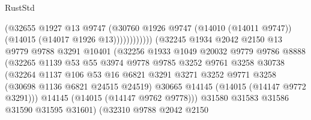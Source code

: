 \begin{lexlean}{RustStd}
\begin{coremodule}
                                          (@32655
                                            @1927
                                            @13
                                            @9747
                                            (@30760
                                              @1926
                                              @9747
                                              (@14010 (@14011 @9747))
                                              (@14015 (@14017 @1926 @13))))))))))))
                          (@32245
                            @1934
                            @2042
                            @2150
                            @13
                            @9779
                            @9788
                            @3291
                            @10401
                            (@32256
                              @1933
                              @1049
                              @20032
                              @9779
                              @9786
                              @8888
                              (@32265
                                @1139
                                @53
                                @55
                                @3974
                                @9778
                                @9785
                                @3252
                                @9761
                                @3258
                                @30738
                                (@32264
                                  @1137
                                  @106
                                  @53
                                  @16
                                  @6821
                                  @3291
                                  @3271
                                  @3252
                                  @9771
                                  @3258
                                  (@30698 @1136 @6821 @24515 @24519)
                                  @30665
                                  @14145
                                  (@14015 (@14147 @9772 @3291)))
                                @14145
                                (@14015 (@14147 @9762 @9778)))
                              @31580
                              @31583
                              @31586
                              @31590
                              @31595
                              @31601)
                            (@32310
                              @9788
                              @2042
                              @2150

\end{coremodule}
\end{lexlean}
